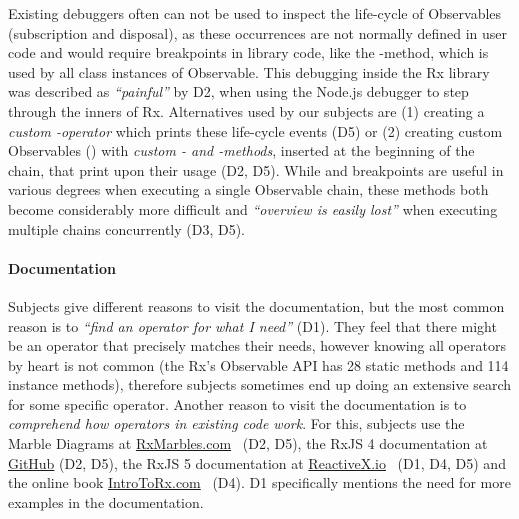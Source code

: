 Existing debuggers often can not be used to inspect the life-cycle of
Observables (subscription and disposal), as these occurrences are not
normally defined in user code and would require breakpoints in library
code, like the -method, which is used by all class
instances of Observable.  This debugging inside the Rx library was
described as \emph{``painful''} by D2, when using the Node.js debugger
to step through the inners of Rx.  Alternatives used by our subjects are
(1) creating a \emph{custom -operator} which prints these
life-cycle events (D5) or (2) creating custom Observables ()
with \emph{custom - and -methods}, inserted at the
beginning of the chain, that print upon their usage (D2, D5).  While
\printfdebugging{} and breakpoints are useful in various degrees when
executing a single Observable chain, these methods both become
considerably more difficult and \emph{``overview is easily lost''} when
executing multiple chains concurrently (D3, D5).

\paragraph{Documentation} Subjects give different reasons to visit the
documentation, but the most common reason is to \emph{``find an operator
for what I need''} (D1).  They feel that there might be an operator that
precisely matches their needs, however knowing all operators by heart is
not common (the Rx's Observable API has 28 static methods and 114
instance methods), therefore subjects sometimes end up doing an
extensive search for some specific operator.  Another reason to visit
the documentation is to \emph{comprehend how operators in existing code
work}.  For this, subjects use the Marble Diagrams at \href{http://rxmarbles.com}
{RxMarbles.com}~\cite{rxmarbles} (D2, D5), the RxJS 4 documentation at
\href{https://github.com/Reactive-Extensions/RxJS/blob/master/doc/} {GitHub}
(D2, D5), the RxJS 5 documentation at \href{http://reactivex.io/rxjs} {ReactiveX.io}~\cite
{reactivex} (D1, D4, D5) and the online book \href{http://introtorx.com}
{IntroToRx.com}~\cite{introtorx} (D4).  D1 specifically mentions the
need for more examples in the documentation.

